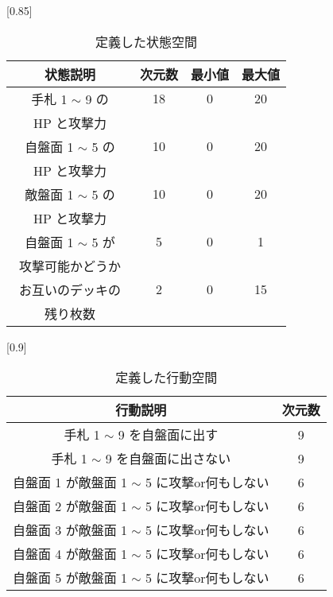 \documentclass[twocolumn]{jarticle}     %
\begin{document}
\begin{table}[H]
  \centering
  \caption{定義した状態空間}
  \label{table:state}
  \vspace{-0.3cm}
  \scalebox{0.85}[0.85]{
    \begin{tabular}{|c|c|c|c|}
      \hline
      状態説明                        & 次元数        & 最小値        & 最大値         \\ \hline \hline
      手札 1 $\sim$ 9 の      & 18         & 0          & 20          \\
        HP と攻撃力　& & & \\
      \hline
      自盤面 1 $\sim$ 5 の      & 10         & 0          & 20 \\
      HP と攻撃力　& & & \\
      \hline
      敵盤面 1 $\sim$ 5 の  & 10         & 0          & 20          \\
      HP と攻撃力　& & & \\
      \hline
      自盤面 1 $\sim$ 5 が & 5          & 0          & 1           \\
      攻撃可能かどうか　& & & \\
      \hline
      お互いのデッキの     & 2 & 0 & 15 \\
      残り枚数　& & & \\
       \hline
      \end{tabular}
  }
  \end{table}

  \begin{table}[H]
    \centering
    \caption{定義した行動空間}
    \vspace{-0.3cm}
    \label{table:action}
    \scalebox{0.9}[0.9]{
      \begin{tabular}{|c|c|}
        \hline
        行動説明                          & 次元数        \\ \hline \hline
        手札 1 $\sim$ 9 を自盤面に出す             & 9          \\ \hline
        手札 1 $\sim$ 9 を自盤面に出さない & 9 \\ \hline
        自盤面 1 が敵盤面 1 $\sim$ 5 に攻撃or何もしない    & 6          \\ \hline
        自盤面 2 が敵盤面 1 $\sim$ 5 に攻撃or何もしない    & 6          \\ \hline
        自盤面 3 が敵盤面 1 $\sim$ 5 に攻撃or何もしない    & 6          \\ \hline
        自盤面 4 が敵盤面 1 $\sim$ 5 に攻撃or何もしない    & 6          \\ \hline
        自盤面 5 が敵盤面 1 $\sim$ 5 に攻撃or何もしない    & 6          \\ \hline
        \end{tabular}
    }
    \end{table}
  
\end{document}

